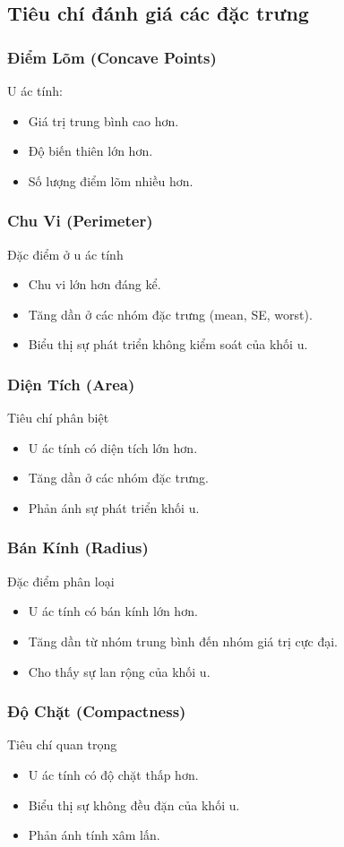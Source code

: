 \subsection{Tiêu chí đánh giá các đặc trưng}
\subsubsection{Điểm Lõm (Concave Points)}
U ác tính:
\begin{itemize}
    \item Giá trị trung bình cao hơn.
    \item Độ biến thiên lớn hơn.
    \item Số lượng điểm lõm nhiều hơn.
\end{itemize}
\subsubsection{Chu Vi (Perimeter)}
Đặc điểm ở u ác tính
\begin{itemize}
    \item Chu vi lớn hơn đáng kể.
    \item Tăng dần ở các nhóm đặc trưng (mean, SE, worst).
    \item Biểu thị sự phát triển không kiểm soát của khối u.
\end{itemize}
\subsubsection{Diện Tích (Area)}
Tiêu chí phân biệt
\begin{itemize}
    \item U ác tính có diện tích lớn hơn.
    \item Tăng dần ở các nhóm đặc trưng.
    \item Phản ánh sự phát triển khối u.
\end{itemize}
\subsubsection{Bán Kính (Radius)}
Đặc điểm phân loại
\begin{itemize}
    \item U ác tính có bán kính lớn hơn.
    \item Tăng dần từ nhóm trung bình đến nhóm giá trị cực đại.
    \item Cho thấy sự lan rộng của khối u.
\end{itemize}
\subsubsection{Độ Chặt (Compactness)}
Tiêu chí quan trọng 
\begin{itemize}
    \item U ác tính có độ chặt thấp hơn.
    \item Biểu thị sự không đều đặn của khối u.
    \item Phản ánh tính xâm lấn.
\end{itemize}
